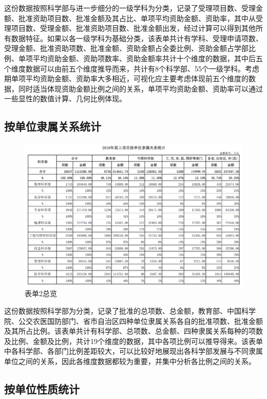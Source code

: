 \documentclass[a4paper,11pt,UTF8]{ctexart}
\begin{document}
这份数据按照科学部与进一步细分的一级学科为分类，记录了受理项目数、受理金额、批准资助项目数、批准金额及其占比、单项平均资助金额、资助率，其中从受理项目数、受理金额、批准资助项目数、批准金额出发，经过计算可以得到其他所有数据特征。如果以各一级学科为基础分类，该表单共计有学科、受理申请项数、受理金额、批准资助项数、批准金额、资助金额占全委比例、资助金额占学部比例、单项平均资助金额、资助项数率、资助金额率共计十个维度的数据，其中后五个维度数据可以由前五个维度推导而来，共计有8个科学部、55个一级学科。考虑期单项平均资助金额、资助率大多相近，可视化应主要考虑体现前五个维度的数据，同时适当体现资助金额比例之间的关系，单项平均资助金额、资助率可以通过一些显性的数值计算、几何比例体现。

\subsection{按单位隶属关系统计}

\begin{figure}[ht]
\centering
\includegraphics[scale=0.25]{QQ20191028141521.png}
\caption{表单2总览}
\end{figure}

这份数据按照科学部为分类，记录了批准的总项数、总金额，教育部、中国科学院、公交农医国防部门、省市自治区四种单位隶属关系各自的批准项数、批准金额及其所占比例。该表单共计有科学部、总项数、总金额、四种隶属关系每种的项数及比例、金额及比例，共计19个维度的数据，其中各项比例可以推导得来。该表单中各科学部、各部门比例差距较大，可以比较好地展现出各科学部发展与不同隶属单位之间的关系，因此各维度数据都较为重要，并集中分析各比例之间的关系。

\subsection{按单位性质统计}
\end{document}
